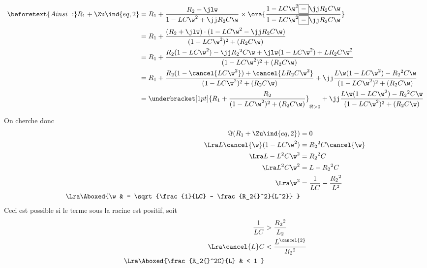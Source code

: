 \documentclass[../TDE6_rsf.tex]{subfiles}%
\begin{document}
{	\begin{align*}
		\beforetext{Ainsi~:}
		R_1 + \Zu\ind{eq,2} & =
		R_1 + \frac{R_2 + \jlw}{1 - LC\w^2 + \jj R_2C\w} \times
		\ora{\frac{1 - LC\w^2 \boxed{-}\jj R_2C\w}{1 - LC\w^2 \boxed{-}\jj R_2C\w}}
		\\
		                    & =
		R_1 +
		\frac{%
			(R_2+\jlw)\cdot (1 - LC\w^2 - \jj R_2C\w)
		}{%
			(1-LC\w^2)^2 + (R_2C\w)
		}
		\\&=
		R_1 + \frac{%
		R_2 (1-LC\w^2)-\jj R_2{}^2C\w + \jlw (1-LC\w^2) + LR_2C\w^2
		}{%
		(1-LC\w^2)^2 + (R_2C\w)
		}
		\\&=
		R_1 +
		\frac{R_2 (1-\cancel{LC\w^2}) + \cancel{LR_2C\w^2}}{(1-LC\w^2)^2 + (R_2C\w)} +
		\jj \frac{L\w (1-LC\w^2) -R_2{}^2C\w}{(1-LC\w^2)^2 + (R_2C\w)}
		\\&=
		\underbracket[1pt]{R_1 + \frac{R_2}{(1-LC\w^2)^2 + (R_2C\w)}}_{\Re > 0} +
		\jj \frac{L\w (1-LC\w^2) -R_2{}^2C\w}{(1-LC\w^2)^2 + (R_2C\w)}
	\end{align*}
	\begin{isd}
		On cherche donc
		\begin{align*}
			\Im(R_1 + \Zu\ind{eq,2}) & = 0
			\\\Lra
			L \cancel{\w} (1-LC\w^2) & = R_2{}^2C \cancel{\w}
			\\\Lra
			L - L^2 C\w^2            & = R_2{}^2C
			\\\Lra
			L^2C\w^2                 & = L - R_2{}^2C
			\\\Lra
			\w^2                     & = \frac{1}{LC} - \frac{R_2{}^2}{L^2}
			\\\Lra
			\Aboxed{%
			\w                       & = \sqrt{\frac{1}{LC} - \frac{R_2{}^2}{L^2}}
			}
		\end{align*}
		\tcblower
		Ceci est possible si le terme sous la racine est positif, soit
		\begin{align*}
			\frac{1}{LC}       & > \frac{R_2{}^2}{L_2}
			\\\Lra
			\cancel{L}C        & < \frac{L^{\cancel{2}}}{R_2{}^2}
			\\\Lra
			\Aboxed{%
			\frac{R_2{}^2C}{L} & < 1
			}
		\end{align*}
	\end{isd}
	\vspace{-15pt}
}
\end{document}
